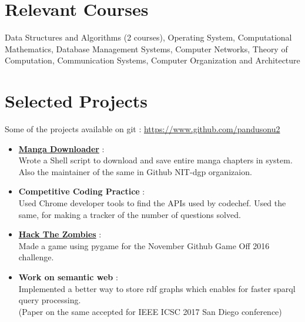 \documentclass[margin, centered]{res}
\begin{document}
\begin{resume}
\section{Relevant \hspace{2mm} Courses}
Data Structures and Algorithms (2 courses), Operating System, Computational Mathematics, Database Management Systems, Computer Networks, Theory of Computation, Communication Systems, Computer Organization and Architecture

\section{Selected Projects}
Some of the projects available on git : \url{https://www.github.com/pandusonu2}
\begin{itemize}[leftmargin=*]
 \item \textbf{\href{https://github.com/NITDgpOS/manga}{Manga Downloader}} :\\
 Wrote a Shell script to download and save entire manga chapters in system. Also the maintainer of the same in Github NIT-dgp organizaion.
 \item \textbf{Competitive Coding Practice} :\\
 Used Chrome developer tools to find the APIs used by codechef. Used the same, for making a tracker of the number of questions solved.
 \item \textbf{\href{https://github.com/pandusonu2/game-off-2016}{Hack The Zombies}} :\\
 Made a game using pygame for the November Github Game Off 2016 challenge.
 \item \textbf{Work on semantic web} :\\
 Implemented a better way to store rdf graphs which enables for faster sparql query processing.\\
 (Paper on the same accepted for IEEE ICSC 2017 San Diego conference)
\end{itemize}



\end{resume}
\end{document}
